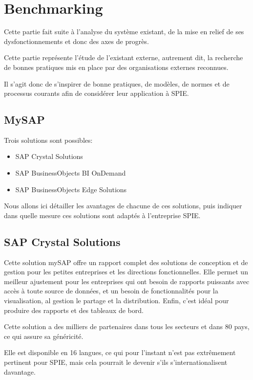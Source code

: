 \section{Benchmarking}

Cette partie fait suite à l'analyse du système existant, de la mise en relief de ses dysfonctionnements et donc des axes de progrès.

Cette partie représente l'étude de l'existant externe, autrement dit, la recherche de bonnes pratiques mis en place par des organisations externes reconnues.

Il s'agit donc de s'inspirer de bonne pratiques, de modèles, de normes et de processus courants afin de considérer leur application à SPIE.

\subsection{MySAP}

Trois solutions sont possibles:

\begin{itemize}
\item SAP Crystal Solutions
\item SAP BusinessObjects BI OnDemand
\item SAP BusinessObjects Edge Solutions
\end{itemize}

Nous allons ici détailler les avantages de chacune de ces solutions, puis indiquer dans quelle mesure ces solutions sont adaptés à l’entreprise SPIE.

\subsection{SAP Crystal Solutions}

Cette solution mySAP offre un rapport complet des solutions de conception et de gestion pour les petites entreprises et les directions fonctionnelles. Elle permet un meilleur ajustement pour les entreprises qui ont besoin de rapports puissants avec accès à toute source de données, et un besoin de fonctionnalités pour la visualisation, al gestion le partage et la distribution. Enfin, c’est idéal pour produire des rapports et des tableaux de bord.

Cette solution a des milliers de partenaires dans tous les secteurs et dans 80 pays, ce qui assure sa généricité.

Elle est disponible en 16 langues, ce qui pour l’instant n’est pas extrêmement pertinent pour SPIE, mais cela pourrait le devenir s’ils s’internationalisent davantage.

